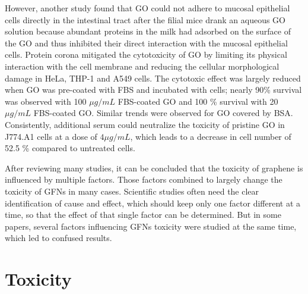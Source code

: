 \documentclass[twoside,twocolumn,9pt]{article}
\begin{document}
However, another study found that GO could not adhere to mucosal epithelial cells directly in the intestinal tract after the filial mice drank an aqueous GO solution because abundant proteins in the milk had adsorbed on the surface of the GO and thus inhibited their direct interaction with the mucosal epithelial cells. Protein corona mitigated the cytotoxicity of GO by limiting its physical interaction with the cell membrane and reducing the cellular morphological damage in HeLa, THP-1 and A549 cells. The cytotoxic effect was largely reduced when GO was pre-coated with FBS and incubated with cells; nearly 90\% survival was observed with 100 $\mu g/mL$ FBS-coated GO and 100 \% survival with 20 $\mu g/mL$ FBS-coated GO. Similar trends were observed for GO covered by BSA. Consistently, additional serum could neutralize the toxicity of pristine GO in J774.A1 cells at a dose of $4 \mu g/mL$, which leads to a decrease in cell number of 52.5 \% compared to untreated cells.

After reviewing many studies, it can be concluded that the toxicity of graphene is influenced by multiple factors. Those factors combined to largely change the toxicity of GFNs in many cases. Scientific studies often need the clear identification of cause and effect, which should keep only one factor different at a time, so that the effect of that single factor can be determined. But in some papers, several factors influencing GFNs toxicity were studied at the same time, which led to confused results.

\section{Toxicity}
\end{document}
